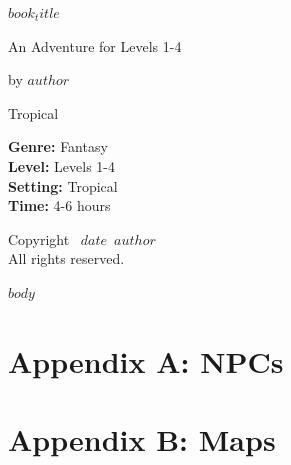 \documentclass[12pt]{memoir}
\def\booktitle{$book_title$}
\def\bookauthor{$author$}
\def\bookdate{$date$}
\def\booklevel{Levels 1-4}
\def\bookenv{Tropical}
\begin{document}
\thispagestyle{empty}
\begin{center}
\vspace*{0.5in}
{\Huge\bfseries\booktitle\par}
\vspace{0.5in}
{\Large An Adventure for \booklevel\par}
\vspace{0.5in}
{\large by \bookauthor\par}
\vfill
{\large\bookenv}
\end{center}

\clearpage
\thispagestyle{empty}
\begin{tcolorbox}[title=Adventure Summary]
\textbf{Genre:} Fantasy\\
\textbf{Level:} \booklevel\\
\textbf{Setting:} \bookenv\\
\textbf{Time:} 4-6 hours
\end{tcolorbox}

\clearpage
\thispagestyle{empty}
\vspace*{\fill}
\begin{center}
Copyright \textcopyright\ \bookdate\ \bookauthor\\
All rights reserved.
\end{center}
\vspace*{\fill}

\clearpage
\tableofcontents

\mainmatter

$body$

\clearpage
\chapter*{Appendix A: NPCs}

\clearpage
\chapter*{Appendix B: Maps}
\end{document}
